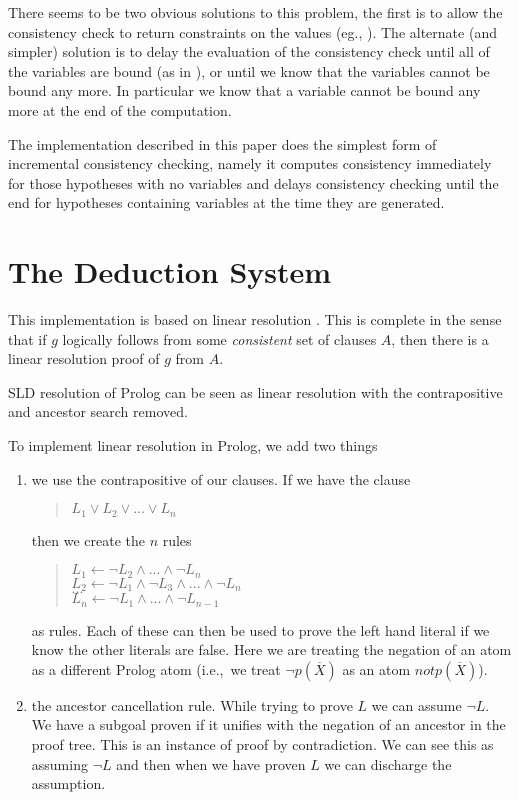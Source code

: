 There seems to be two obvious solutions to this problem,
the first is to allow the consistency check to return constraints on the
values (eg., \cite{edmonson}). The alternate (and simpler) solution is
to delay the evaluation of the consistency check until all of the variables
are bound (as in \cite{naish86}), or until we know that the variables
cannot be bound any more. In particular we know that a variable cannot be
bound any more at the end of the computation.

The implementation described in this paper
does the simplest form of incremental consistency checking, namely it computes
consistency immediately for those hypotheses with no variables and delays
consistency checking until the end for hypotheses containing variables
at the time they are generated.
\section{The Deduction System} \label{deduction}

This implementation is based on linear resolution \cite{chang,loveland78}.
This is complete in the
sense that if $g$ logically follows from some {\em consistent} set of
clauses $A$, then there is a linear resolution proof of $g$ from $A$.

SLD resolution of Prolog \cite{lloyd} can be seen as linear resolution with
the contrapositive and ancestor search removed.

To implement linear resolution in Prolog, we add two things
\begin{enumerate}
\item we use the contrapositive of our clauses. If we have the clause
\begin{verse}
$L_1 \vee L_2 \vee ... \vee L_n$
\end{verse}
then we create the $n$ rules
\begin{verse}
$L_1 \leftarrow \neg L_2 \wedge ... \wedge \neg L_n$\\
$L_2 \leftarrow \neg L_1 \wedge \neg L_3 \wedge ... \wedge \neg L_n$\\
$...$\\
$L_n \leftarrow \neg L_1 \wedge ... \wedge \neg L_{n-1}$
\end{verse}
as rules. Each of these can then be used to prove the left hand literal
if we know the other literals are false. Here we are treating the negation
of an atom as a different Prolog atom (i.e.,\ we treat $\neg p(\overline{X})$
as an atom $notp(\overline{X})$).
\item the ancestor cancellation rule. While trying to prove $L$ we can assume
$\neg L$. We have a subgoal proven if it unifies with the negation of
an ancestor in the proof tree.
This is an instance of proof by contradiction. We can see this as assuming
$\neg L$ and then when we have proven $L$ we can discharge the assumption.
\end{enumerate}

